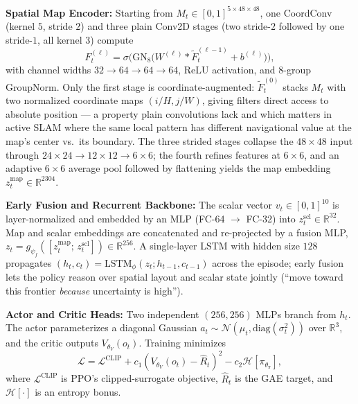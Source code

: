 \documentclass[conference]{IEEEtran}
\begin{document}
\textbf{Spatial Map Encoder:} Starting from $M_t\!\in\![0,1]^{5{\times}48{\times}48}$, one CoordConv (kernel $5$, stride $2$) and three plain Conv2D stages (two stride-$2$ followed by one stride-$1$, all kernel $3$) compute
\begin{equation}
F^{(\ell)}_t = \sigma\big(\mathrm{GN}_8\big(W^{(\ell)}\!*\!\widetilde{F}^{(\ell-1)}_t + b^{(\ell)}\big)\big),
\label{eq:coordconv}
\end{equation}
with channel widths $32\!\to\!64\!\to\!64\!\to\!64$, ReLU activation, and $8$-group GroupNorm. Only the first stage is coordinate-augmented: $\widetilde{F}^{(0)}_t$ stacks $M_t$ with two normalized coordinate maps $(i/H, j/W)$, giving filters direct access to absolute position --- a property plain convolutions lack and which matters in active SLAM where the same local pattern has different navigational value at the map's center vs.\ its boundary. The three strided stages collapse the $48{\times}48$ input through $24{\times}24\!\to\!12{\times}12\!\to\!6{\times}6$; the fourth refines features at $6{\times}6$, and an adaptive $6{\times}6$ average pool followed by flattening yields the map embedding $z^{\text{map}}_t \in \mathbb{R}^{2304}$.

\textbf{Early Fusion and Recurrent Backbone:} The scalar vector $v_t\!\in\![0,1]^{10}$ is layer-normalized and embedded by an MLP (FC-64 $\to$ FC-32) into $z^{\text{scl}}_t\!\in\!\mathbb{R}^{32}$. Map and scalar embeddings are concatenated and re-projected by a fusion MLP, $z_t = g_{\psi_f}([z^{\text{map}}_t;\,z^{\text{scl}}_t]) \in \mathbb{R}^{256}$. A single-layer LSTM with hidden size $128$ propagates $(h_t, c_t) = \mathrm{LSTM}_\phi(z_t; h_{t-1}, c_{t-1})$ across the episode; early fusion lets the policy reason over spatial layout and scalar state jointly (``move toward this frontier \emph{because} uncertainty is high'').

\textbf{Actor and Critic Heads:} Two independent $(256,256)$ MLPs branch from $h_t$. The actor parameterizes a diagonal Gaussian $a_t \sim \mathcal{N}(\mu_t, \mathrm{diag}(\sigma_t^2))$ over $\mathbb{R}^3$, and the critic outputs $V_{\theta_V}(o_t)$. Training minimizes
\begin{equation}
\mathcal{L} = \mathcal{L}^{\text{CLIP}} + c_1(V_{\theta_V}(o_t)-\hat{R}_t)^2 - c_2\mathcal{H}[\pi_{\theta_\pi}],
\label{eq:ppo_loss}
\end{equation}
where $\mathcal{L}^{\text{CLIP}}$ is PPO's clipped-surrogate objective, $\hat{R}_t$ is the GAE target, and $\mathcal{H}[\cdot]$ is an entropy bonus.
\end{document}
